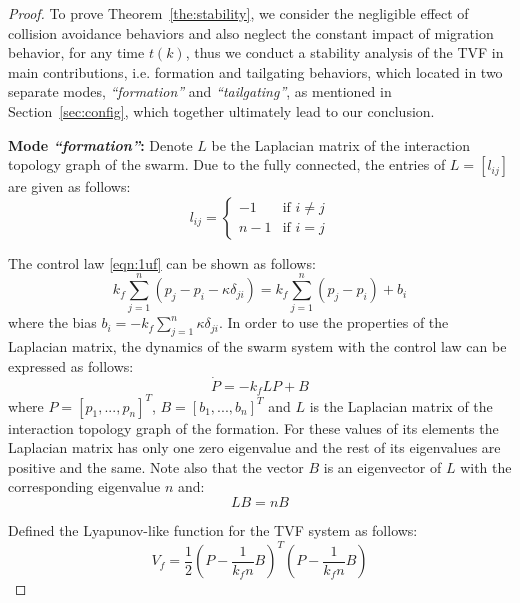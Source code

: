 \begin{proof}
To prove Theorem~\ref{the:stability}, we consider the negligible effect of collision avoidance behaviors and also neglect the constant impact of migration behavior, for any time $t(k)$, thus we conduct a stability analysis of the TVF in main contributions, i.e. formation and tailgating behaviors, which located in two separate modes, \textit{``formation''} and \textit{``tailgating''}, as mentioned in Section~\ref{sec:config}, which together ultimately lead to our conclusion.

\textbf{Mode \textit{``formation''}:} Denote $L$ be the Laplacian matrix of the interaction topology graph of the swarm. Due to the fully connected, the entries of $L=\left[l_{ij}\right]$ are given as follows:
\begin{equation}
    l_{ij}=\begin{cases}
    -1 & \text{if }i\neq j \\
    n-1 & \text{if }i=j
    \end{cases}
\end{equation}

The control law \eqref{eqn:1uf} can be shown as follows:
\begin{equation}
    k_f\sum_{j=1}^n{\left(p_j-p_i-\kappa \delta_{ji}\right)}=k_f\sum_{j=1}^n{\left(p_j-p_i\right)}+b_i
\end{equation}
where the bias $b_i=-k_f\sum_{j=1}^n\kappa \delta_{ji}$.  In order to use the properties of the Laplacian matrix, the dynamics of the swarm system with the control law can be expressed as follows:
\begin{equation}
    \dot{P}=-k_fLP+B
\end{equation}
where $P=\left[p_1,...,p_n\right]^T$, $B=\left[b_1,...,b_n\right]^T$ and $L$ is the Laplacian matrix of the interaction topology graph of the formation. For these values of its elements the Laplacian matrix has only one zero eigenvalue and the rest of its eigenvalues are positive and the same. Note also that the vector $B$ is an eigenvector of $L$ with the corresponding eigenvalue $n$ and:
\begin{equation}
    LB=nB
\end{equation}

Defined the Lyapunov-like function for the TVF system as follows:
\begin{equation}
    V_f=\dfrac{1}{2}\left(P-\dfrac{1}{k_fn}B\right)^T\left(P-\dfrac{1}{k_fn}B\right)
\end{equation}


\end{proof}
